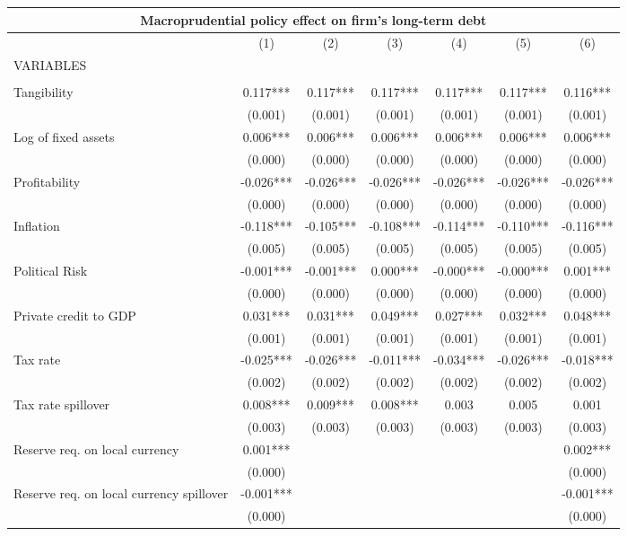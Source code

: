 \begin{tabular}{lcccccc}
\multicolumn{7}{c}{Macroprudential policy effect on firm's long-term debt} \\ \hline
 & (1) & (2) & (3) & (4) & (5) & (6) \\
VARIABLES &  &  &  &  &  &  \\ \hline
 &  &  &  &  &  &  \\
Tangibility & 0.117*** & 0.117*** & 0.117*** & 0.117*** & 0.117*** & 0.116*** \\
 & (0.001) & (0.001) & (0.001) & (0.001) & (0.001) & (0.001) \\
Log of fixed assets & 0.006*** & 0.006*** & 0.006*** & 0.006*** & 0.006*** & 0.006*** \\
 & (0.000) & (0.000) & (0.000) & (0.000) & (0.000) & (0.000) \\
Profitability & -0.026*** & -0.026*** & -0.026*** & -0.026*** & -0.026*** & -0.026*** \\
 & (0.000) & (0.000) & (0.000) & (0.000) & (0.000) & (0.000) \\
Inflation & -0.118*** & -0.105*** & -0.108*** & -0.114*** & -0.110*** & -0.116*** \\
 & (0.005) & (0.005) & (0.005) & (0.005) & (0.005) & (0.005) \\
Political Risk & -0.001*** & -0.001*** & 0.000*** & -0.000*** & -0.000*** & 0.001*** \\
 & (0.000) & (0.000) & (0.000) & (0.000) & (0.000) & (0.000) \\
Private credit to GDP & 0.031*** & 0.031*** & 0.049*** & 0.027*** & 0.032*** & 0.048*** \\
 & (0.001) & (0.001) & (0.001) & (0.001) & (0.001) & (0.001) \\
Tax rate & -0.025*** & -0.026*** & -0.011*** & -0.034*** & -0.026*** & -0.018*** \\
 & (0.002) & (0.002) & (0.002) & (0.002) & (0.002) & (0.002) \\
Tax rate spillover & 0.008*** & 0.009*** & 0.008*** & 0.003 & 0.005 & 0.001 \\
 & (0.003) & (0.003) & (0.003) & (0.003) & (0.003) & (0.003) \\
Reserve req. on local currency & 0.001*** &  &  &  &  & 0.002*** \\
 & (0.000) &  &  &  &  & (0.000) \\
Reserve req. on local currency spillover & -0.001*** &  &  &  &  & -0.001*** \\
 & (0.000) &  &  &  &  & (0.000) \\

\end{tabular}
